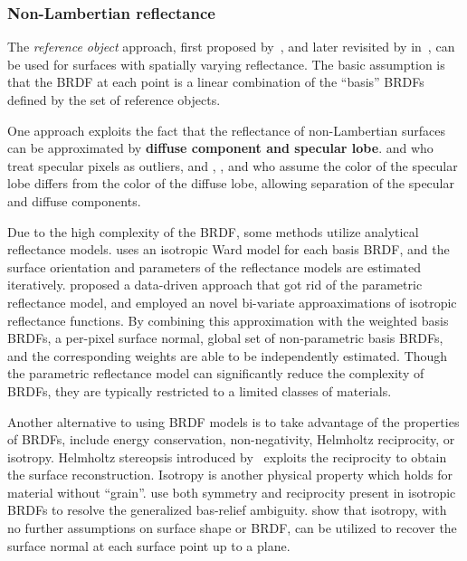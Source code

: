 \subsubsection{Non-Lambertian reflectance}
The \textit{reference object} approach, first proposed by~\citeauthor{silver1980determining}, and later revisited by in~\cite{hertzmann2005example}, can be used for surfaces with spatially varying reflectance. The basic assumption is that the BRDF at each point is a linear combination of the ``basis'' BRDFs defined by the set of reference objects.

One approach exploits the fact that the reflectance of non-Lambertian surfaces can be approximated by \textbf{diffuse component and specular lobe}. \citeauthor{coleman1982obtaining} and \citeauthor{barsky20034} who treat specular pixels as outliers, and \citeauthor{schluns1993photometric}, \citeauthor{sato1994temporal}, and \citeauthor{mallick2005beyond} who assume the color of the specular lobe differs from the color of the diffuse lobe, allowing separation of the specular and diffuse components.

Due to the high complexity of the BRDF, some methods utilize {analytical reflectance models}. \citeauthor{goldman2010shape} uses an isotropic Ward model for each basis BRDF, and the surface orientation and parameters of the reflectance models are estimated iteratively. \citeauthor{alldrin2008photometric} proposed a data-driven approach that got rid of the parametric reflectance model, and employed an novel bi-variate approaximations of isotropic reflectance functions. By combining this approximation with the weighted basis BRDFs, a per-pixel surface normal, global set of non-parametric basis BRDFs, and the corresponding weights are able to be independently estimated. Though the parametric reflectance model can significantly reduce the complexity of BRDFs, they are typically restricted to a limited classes of materials.

Another alternative to using BRDF models is to take advantage of the properties of BRDFs, include energy conservation, non-negativity, Helmholtz reciprocity, or isotropy. Helmholtz stereopsis introduced by~\citeauthor{zickler2002helmholtz} exploits the reciprocity to obtain the surface reconstruction. Isotropy is another physical property which holds for material without ``grain''. \citeauthor{tan2007isotropy} use both symmetry and reciprocity present in isotropic BRDFs to resolve the generalized bas-relief ambiguity. \citeauthor{alldrin2007toward} show that isotropy, with no further assumptions on surface shape or BRDF, can be utilized to recover the surface normal at each surface point up to a plane.

